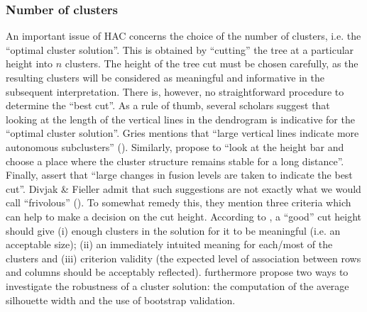 \subsubsection{Number of clusters}\label{sec:3.7.2.3}\largerpage
An important issue of HAC concerns the choice of the number of clusters, i.e. the ``optimal cluster solution''. This is obtained by ``cutting'' the tree at a particular height into $n$ clusters. The height of the tree cut must be chosen carefully, as the resulting clusters will be considered as meaningful and informative in the subsequent interpretation. There is, however, no straightforward procedure to determine the ``best cut''. As a rule of thumb, several scholars suggest that looking at the length of the vertical lines in the dendrogram is indicative for the ``optimal cluster solution''. Gries mentions that “large vertical lines indicate more autonomous subclusters” (\citeyear[338]{gries_statistics_2013}). Similarly, \citet[430]{glynn_cluster_2014} propose to “look at the height bar and choose a place where the cluster structure remains stable for a long distance”. Finally, \citet[95]{everitt_cluster_2011} assert that “large changes in fusion levels are taken to indicate the best cut”. Divjak \& Fieller admit that such suggestions are not exactly what we would call “frivolous” (\citeyear[430]{glynn_cluster_2014}). To somewhat remedy this, they mention three criteria which can help to make a decision on the cut height. According to \citet[432--433]{glynn_cluster_2014}, a ``good'' cut height should give (i) enough clusters in the solution for it to be meaningful (i.e. an acceptable size); (ii) an immediately intuited meaning for each\slash most of the clusters and (iii) criterion validity (the expected level of association between rows and columns should be acceptably reflected). \citet[432--433]{glynn_cluster_2014} furthermore propose two ways to investigate the robustness of a cluster solution: the computation of the average silhouette width and the use of bootstrap validation.

